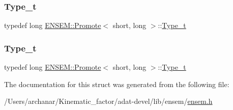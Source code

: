 \mbox{\label{structENSEM_1_1Promote_3_01short_00_01long_01_4_a560571e93323f728261d16b19c7d0df7}} 
\subsubsection{\texorpdfstring{Type\_t}{Type\_t}\hspace{0.1cm}{\footnotesize\ttfamily [2/3]}}
{\footnotesize\ttfamily typedef long \mbox{\hyperlink{structENSEM_1_1Promote}{E\+N\+S\+E\+M\+::\+Promote}}$<$ short, long $>$\+::\mbox{\hyperlink{structENSEM_1_1Promote_3_01short_00_01long_01_4_a560571e93323f728261d16b19c7d0df7}{Type\+\_\+t}}}

\mbox{\label{structENSEM_1_1Promote_3_01short_00_01long_01_4_a560571e93323f728261d16b19c7d0df7}} 
\subsubsection{\texorpdfstring{Type\_t}{Type\_t}\hspace{0.1cm}{\footnotesize\ttfamily [3/3]}}
{\footnotesize\ttfamily typedef long \mbox{\hyperlink{structENSEM_1_1Promote}{E\+N\+S\+E\+M\+::\+Promote}}$<$ short, long $>$\+::\mbox{\hyperlink{structENSEM_1_1Promote_3_01short_00_01long_01_4_a560571e93323f728261d16b19c7d0df7}{Type\+\_\+t}}}



The documentation for this struct was generated from the following file\+:\begin{DoxyCompactItemize}
\item 
/\+Users/archanar/\+Kinematic\+\_\+factor/adat-\/devel/lib/ensem/\mbox{\hyperlink{adat-devel_2lib_2ensem_2ensem_8h}{ensem.\+h}}\end{DoxyCompactItemize}
